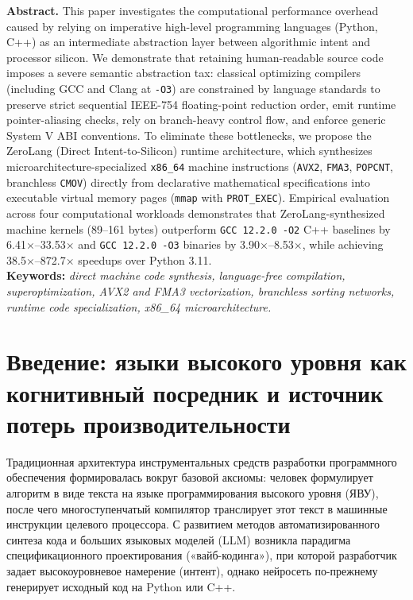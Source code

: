 \documentclass[11pt,a4paper]{article}
\begin{document}
{{\textbf{\color{primary}Abstract.} This paper investigates the computational performance overhead caused by relying on imperative high-level programming languages (Python, C++) as an intermediate abstraction layer between algorithmic intent and processor silicon. We demonstrate that retaining human-readable source code imposes a severe semantic abstraction tax: classical optimizing compilers (including GCC and Clang at \texttt{-O3}) are constrained by language standards to preserve strict sequential IEEE-754 floating-point reduction order, emit runtime pointer-aliasing checks, rely on branch-heavy control flow, and enforce generic System V ABI conventions. To eliminate these bottlenecks, we propose the ZeroLang (Direct Intent-to-Silicon) runtime architecture, which synthesizes microarchitecture-specialized \texttt{x86\_64} machine instructions (\texttt{AVX2}, \texttt{FMA3}, \texttt{POPCNT}, branchless \texttt{CMOV}) directly from declarative mathematical specifications into executable virtual memory pages (\texttt{mmap} with \texttt{PROT\_EXEC}). Empirical evaluation across four computational workloads demonstrates that ZeroLang-synthesized machine kernels (89–161 bytes) outperform \texttt{GCC 12.2.0 -O2} C++ baselines by 6.41$\times$–33.53$\times$ and \texttt{GCC 12.2.0 -O3} binaries by 3.90$\times$–8.53$\times$, while achieving 38.5$\times$–872.7$\times$ speedups over Python 3.11.\\[4pt]
\textbf{\color{primary}Keywords:} \textit{direct machine code synthesis, language-free compilation, superoptimization, AVX2 and FMA3 vectorization, branchless sorting networks, runtime code specialization, x86\_64 microarchitecture.}
\vspace{4pt}
}}

\section{Введение: языки высокого уровня как когнитивный посредник и источник потерь производительности}

Традиционная архитектура инструментальных средств разработки программного обеспечения формировалась вокруг базовой аксиомы: человек формулирует алгоритм в виде текста на языке программирования высокого уровня (ЯВУ), после чего многоступенчатый компилятор транслирует этот текст в машинные инструкции целевого процессора. С развитием методов автоматизированного синтеза кода и больших языковых моделей (LLM) \cite{cummins2024} возникла парадигма спецификационного проектирования («вайб-кодинга»), при которой разработчик задает высокоуровневое намерение (интент), однако нейросеть по-прежнему генерирует исходный код на Python или C++.
\end{document}
